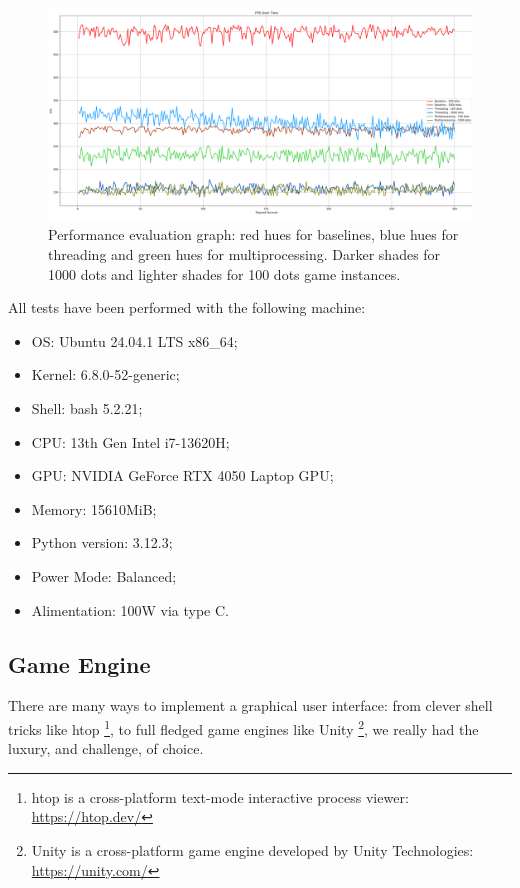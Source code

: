 \begin{figure}[h]
  \centering
  \includegraphics[width=\linewidth]{images/performance_eval_fps_graph.png}
  \caption{Performance evaluation graph: red hues for baselines, blue hues for threading and green hues for multiprocessing. Darker shades for 1000 dots and lighter shades for 100 dots game instances.}
  \label{fig:peval}
\end{figure}

All tests have been performed with the following machine: 

\begin{itemize}
    \item OS: Ubuntu 24.04.1 LTS x86\_64;
    \item Kernel: 6.8.0-52-generic;
    \item Shell: bash 5.2.21;
    \item CPU: 13th Gen Intel i7-13620H;
    \item GPU: NVIDIA GeForce RTX 4050 Laptop GPU;
    \item Memory: 15610MiB;
    \item Python version: 3.12.3;
    \item Power Mode: Balanced;
    \item Alimentation: 100W via type C.
\end{itemize}

\subsection{Game Engine} \label{sec:pygame}

There are many ways to implement a graphical user interface: from clever shell tricks like htop \footnote{htop is a cross-platform text-mode interactive process viewer: \url{https://htop.dev/}}, to full fledged game engines like Unity \footnote{Unity is a cross-platform game engine developed by Unity Technologies: \url{https://unity.com/}}, we really had the luxury, and challenge, of choice.

